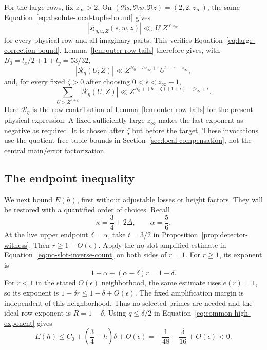 For the large rows, fix \(z_\infty>2\).  On
\((\Re s,\Re w,\Re z)=(2,2,z_\infty)\), the same
Equation~\eqref{eq:absolute-local-tuple-bound} gives
\[
 |\mathfrak H_{\eta,u,Z}(s,w,z)|
 \ll_\epsilon U^\epsilon Z^{\ell z_\infty}
\]
for every physical row and all imaginary parts.  This verifies
Equation~\eqref{eq:large-correction-bound}.  Lemma~\ref{lem:outer-row-tails}
therefore gives, with \(B_0=l_x/2+1+l_y=53/32\),
\[
 |\mathscr R_\eta(U;Z)|
 \ll Z^{B_0+hz_\infty+\epsilon}U^{1+\epsilon-z_\infty},
\]
and, for every fixed \(\zeta>0\) after choosing
\(0<\epsilon<z_\infty-1\),
\[
 \sum_{U>Z^{h+\zeta}}|\mathscr R_\eta(U;Z)|
 \ll
 Z^{B_0+(h+\zeta)(1+\epsilon)-\zeta z_\infty+\epsilon}.
\]
Here \(\mathscr R_\eta\) is the row contribution of
Lemma~\ref{lem:outer-row-tails} for the
present physical expression.  A fixed sufficiently large \(z_\infty\)
makes the last exponent as negative as required.  It is chosen after
\(\zeta\) but before the target.  These invocations use the quotient-free
tuple bounds in Section~\ref{sec:local-compensation}, not the central
main/error factorization.

\subsection{The endpoint inequality}\label{sec:adaptive-endpoint}

We next bound \(E(h)\), first without adjustable losses or height
factors.  They will be restored with a quantified order of choices.
Recall
\[
 \kappa=\frac34+2\Delta,\qquad \alpha=\frac56.
\]
At the live upper endpoint \(\delta=\alpha\), take \(t=3/2\) in
Proposition~\ref{prop:detector-witness}.  Then
\(r\ge1-O(\epsilon)\).  Apply the no-slot amplified estimate
in Equation~\eqref{eq:no-slot-inverse-count} on both sides of
\(r=1\).  For \(r\ge1\), its exponent is
\[
 1-\alpha+(\alpha-\delta)r=1-\delta.
\]
For \(r<1\) in the stated \(O(\epsilon)\) neighborhood, the same
estimate uses \(e(r)=1\), so its exponent is
\(1-\delta r\le1-\delta+O(\epsilon)\).  The fixed amplification
margin is independent of this neighborhood.
Thus no selected primes are needed and the ideal row exponent is
\(R=1-\delta\).  Using \(q\le\delta/2\) in
Equation~\eqref{eq:common-high-exponent} gives
\begin{equation}
 E(h)\le C_0+\left(\frac34-h\right)\delta+O(\epsilon)
       =-\frac1{48}-\frac{\delta}{16}+O(\epsilon)<0.
 \label{eq:large-delta-endpoint}
\end{equation}

